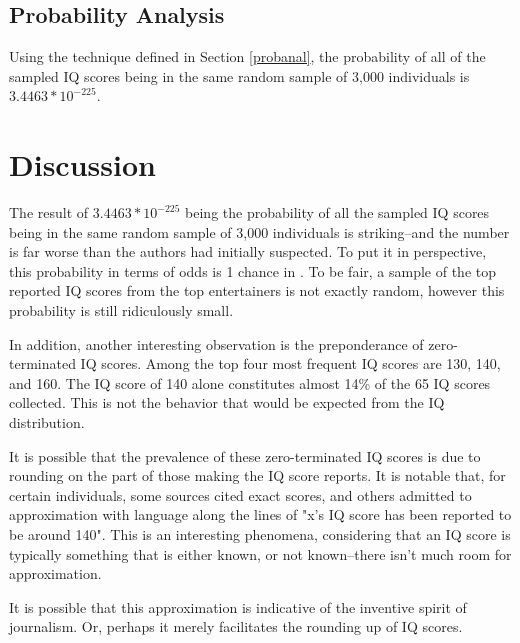 \documentclass[12pt,letterpaper,titlepage,oneside,draft]{article}
\begin{document}
\subsection{Probability Analysis}
Using the technique defined in Section \ref{probanal}, the probability of all of the sampled IQ scores being in the same random sample of 3,000 individuals is $3.4463 * 10^{-225}$.

\section{Discussion}
The result of $3.4463 * 10^{-225}$ being the probability of all the sampled IQ scores being in the same random sample of 3,000 individuals is striking--and the number is far worse than the authors had initially suspected. To put it in perspective, this probability in terms of odds is 1 chance in . To be fair, a sample of the top reported IQ scores from the top entertainers is not exactly random, however this probability is still ridiculously small.

In addition, another interesting observation is the preponderance of zero-terminated IQ scores. Among the top four most frequent IQ scores are 130, 140, and 160. The IQ score of 140 alone constitutes almost 14\% of the 65 IQ scores collected. This is not the behavior that would be expected from the IQ distribution.  

It is possible that the prevalence of these zero-terminated IQ scores is due to rounding on the part of those making the IQ score reports. It is notable that, for certain individuals, some sources cited exact scores, and others admitted to approximation with language along the lines of "x's IQ score has been reported to be around 140". This is an interesting phenomena, considering that an IQ score is typically something that is either known, or not known--there isn't much room for approximation.

It is possible that this approximation is indicative of the inventive spirit of journalism. Or, perhaps it merely facilitates the rounding up of IQ scores.
\end{document}
